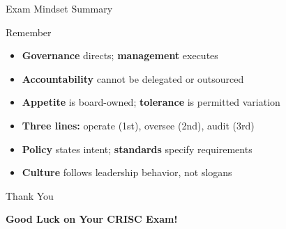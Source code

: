 \documentclass{beamer}
\begin{document}
	\begin{frame}{Exam Mindset Summary}
		\begin{block}{Remember}
			\begin{itemize}
				\item \textbf{Governance} directs; \textbf{management} executes
				\item \textbf{Accountability} cannot be delegated or outsourced
				\item \textbf{Appetite} is board-owned; \textbf{tolerance} is permitted variation
				\item \textbf{Three lines:} operate (1st), oversee (2nd), audit (3rd)
				\item \textbf{Policy} states intent; \textbf{standards} specify requirements
				\item \textbf{Culture} follows leadership behavior, not slogans
			\end{itemize}
		\end{block}
	\end{frame}
	
	\begin{frame}{Thank You}
		\begin{center}
			{\Huge \textbf{Good Luck on Your CRISC Exam!}}
		\end{center}
	\end{frame}
	
\end{document}
